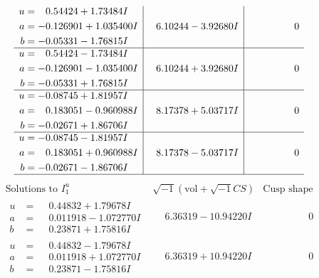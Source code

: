 \documentclass[1p]{elsarticle_modified}
\theoremstyle{definition}
\newcommand{\I}{\sqrt{-1}}
\begin{document}
$$\begin{array}{c|c|c}
\begin{aligned}
u &= \phantom{-}0.54424 + 1.73484 I \\
a &= -0.126901 + 1.035400 I \\
b &= -0.05331 - 1.76815 I\end{aligned}
 & \phantom{-}6.10244 - 3.92680 I & \phantom{-0.000000 } 0 \\ \hline\begin{aligned}
u &= \phantom{-}0.54424 - 1.73484 I \\
a &= -0.126901 - 1.035400 I \\
b &= -0.05331 + 1.76815 I\end{aligned}
 & \phantom{-}6.10244 + 3.92680 I & \phantom{-0.000000 } 0 \\ \hline\begin{aligned}
u &= -0.08745 + 1.81957 I \\
a &= \phantom{-}0.183051 - 0.960988 I \\
b &= -0.02671 + 1.86706 I\end{aligned}
 & \phantom{-}8.17378 + 5.03717 I & \phantom{-0.000000 } 0 \\ \hline\begin{aligned}
u &= -0.08745 - 1.81957 I \\
a &= \phantom{-}0.183051 + 0.960988 I \\
b &= -0.02671 - 1.86706 I\end{aligned}
 & \phantom{-}8.17378 - 5.03717 I & \phantom{-0.000000 } 0\\
 \hline 
 \end{array}$$\newpage$$\begin{array}{c|c|c}  
\text{Solutions to }I^u_{1}& \I (\text{vol} + \sqrt{-1}CS) & \text{Cusp shape}\\
 \hline 
\begin{aligned}
u &= \phantom{-}0.44832 + 1.79678 I \\
a &= \phantom{-}0.011918 - 1.072770 I \\
b &= \phantom{-}0.23871 + 1.75816 I\end{aligned}
 & \phantom{-}6.36319 - 10.94220 I & \phantom{-0.000000 } 0 \\ \hline\begin{aligned}
u &= \phantom{-}0.44832 - 1.79678 I \\
a &= \phantom{-}0.011918 + 1.072770 I \\
b &= \phantom{-}0.23871 - 1.75816 I\end{aligned}
 & \phantom{-}6.36319 + 10.94220 I & \phantom{-0.000000 } 0 \\ \hline\begin{aligned}

\end{aligned}
\end{array}$$
\end{document}
